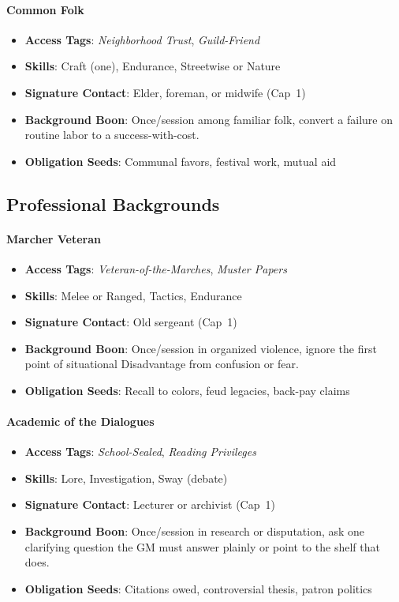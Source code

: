 \paragraph{Common Folk}
\begin{itemize}
\item \textbf{Access Tags}: \textit{Neighborhood Trust}, \textit{Guild-Friend}
\item \textbf{Skills}: Craft (one), Endurance, Streetwise or Nature
\item \textbf{Signature Contact}: Elder, foreman, or midwife (Cap~1)
\item \textbf{Background Boon}: Once/session among familiar folk, convert a failure on routine labor to a success-with-cost.
\item \textbf{Obligation Seeds}: Communal favors, festival work, mutual aid
\end{itemize}

\subsection*{Professional Backgrounds}

\paragraph{Marcher Veteran}
\begin{itemize}
\item \textbf{Access Tags}: \textit{Veteran-of-the-Marches}, \textit{Muster Papers}
\item \textbf{Skills}: Melee or Ranged, Tactics, Endurance
\item \textbf{Signature Contact}: Old sergeant (Cap~1)
\item \textbf{Background Boon}: Once/session in organized violence, ignore the first point of situational Disadvantage from confusion or fear.
\item \textbf{Obligation Seeds}: Recall to colors, feud legacies, back-pay claims
\end{itemize}

\paragraph{Academic of the Dialogues}
\begin{itemize}
\item \textbf{Access Tags}: \textit{School-Sealed}, \textit{Reading Privileges}
\item \textbf{Skills}: Lore, Investigation, Sway (debate)
\item \textbf{Signature Contact}: Lecturer or archivist (Cap~1)
\item \textbf{Background Boon}: Once/session in research or disputation, ask one clarifying question the GM must answer plainly or point to the shelf that does.
\item \textbf{Obligation Seeds}: Citations owed, controversial thesis, patron politics
\end{itemize}

